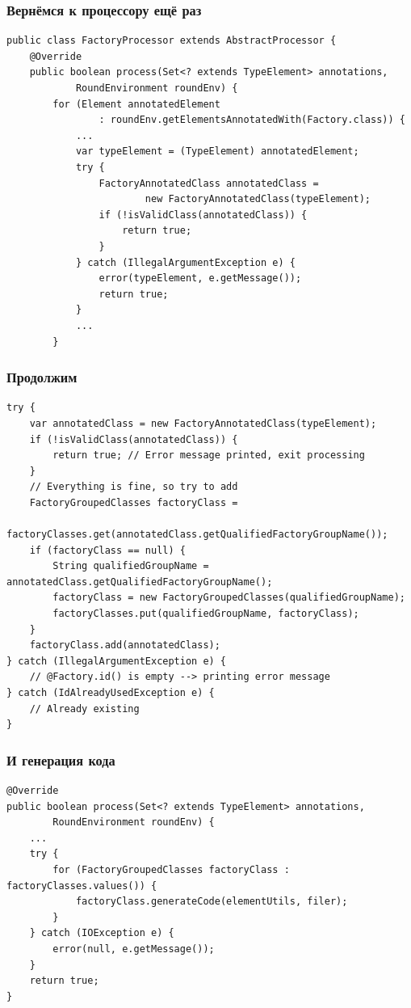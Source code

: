 \documentclass[xetex,mathserif,serif]{beamer}
\begin{document}
	\begin{frame}[fragile]
		\frametitle{Вернёмся к процессору ещё раз}
		\begin{footnotesize}
			\begin{verbatim}
public class FactoryProcessor extends AbstractProcessor {
    @Override
    public boolean process(Set<? extends TypeElement> annotations, 
            RoundEnvironment roundEnv) {
        for (Element annotatedElement 
                : roundEnv.getElementsAnnotatedWith(Factory.class)) {
            ...
            var typeElement = (TypeElement) annotatedElement;
            try {
                FactoryAnnotatedClass annotatedClass =
                        new FactoryAnnotatedClass(typeElement); 
                if (!isValidClass(annotatedClass)) {
                    return true; 
                }
            } catch (IllegalArgumentException e) {
                error(typeElement, e.getMessage());
                return true;
            }
            ...
        }
			\end{verbatim}
		\end{footnotesize}
	\end{frame}

	\begin{frame}[fragile]
		\frametitle{Продолжим}
		\begin{footnotesize}
			\begin{verbatim}
try {
    var annotatedClass = new FactoryAnnotatedClass(typeElement);
    if (!isValidClass(annotatedClass)) {
        return true; // Error message printed, exit processing
    }
    // Everything is fine, so try to add
    FactoryGroupedClasses factoryClass =
            factoryClasses.get(annotatedClass.getQualifiedFactoryGroupName());
    if (factoryClass == null) {
        String qualifiedGroupName = annotatedClass.getQualifiedFactoryGroupName();
        factoryClass = new FactoryGroupedClasses(qualifiedGroupName);
        factoryClasses.put(qualifiedGroupName, factoryClass);
    }
    factoryClass.add(annotatedClass);
} catch (IllegalArgumentException e) {
    // @Factory.id() is empty --> printing error message
} catch (IdAlreadyUsedException e) {
    // Already existing
}
			\end{verbatim}
		\end{footnotesize}
	\end{frame}

	\begin{frame}[fragile]
		\frametitle{И генерация кода}
		\begin{footnotesize}
			\begin{verbatim}
@Override
public boolean process(Set<? extends TypeElement> annotations, 
        RoundEnvironment roundEnv) {
    ...
    try {
        for (FactoryGroupedClasses factoryClass : factoryClasses.values()) {
            factoryClass.generateCode(elementUtils, filer);
        }
    } catch (IOException e) {
        error(null, e.getMessage());
    }
    return true;
}
			\end{verbatim}
		\end{footnotesize}
	\end{frame}
\end{document}
